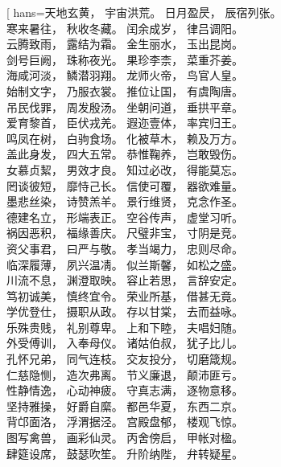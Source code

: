 \translate[
hans={天地玄黄， 宇宙洪荒。 日月盈昃， 辰宿列张。\\
     寒来暑往， 秋收冬藏。 闰余成岁， 律吕调阳。\\
     云腾致雨， 露结为霜。 金生丽水， 玉出昆岗。\\
     剑号巨阙， 珠称夜光。 果珍李柰， 菜重芥姜。\\
     海咸河淡， 鳞潜羽翔。 龙师火帝， 鸟官人皇。\\
     始制文字， 乃服衣裳。 推位让国， 有虞陶唐。\\
     吊民伐罪， 周发殷汤。 坐朝问道， 垂拱平章。\\
     爱育黎首， 臣伏戎羌。 遐迩壹体， 率宾归王。\\
     鸣凤在树， 白驹食场。 化被草木， 赖及万方。\\
     盖此身发， 四大五常。 恭惟鞠养， 岂敢毁伤。\\
     女慕贞絜， 男效才良。 知过必改， 得能莫忘。\\
     罔谈彼短， 靡恃己长。 信使可覆， 器欲难量。\\
     墨悲丝染， 诗赞羔羊。 景行维贤， 克念作圣。\\
     德建名立， 形端表正。 空谷传声， 虚堂习听。\\
     祸因恶积， 福缘善庆。 尺璧非宝， 寸阴是竞。\\
     资父事君， 曰严与敬。 孝当竭力， 忠则尽命。\\
     临深履薄， 夙兴温凊。 似兰斯馨， 如松之盛。\\
     川流不息， 渊澄取映。 容止若思， 言辞安定。\\
     笃初诚美， 慎终宜令。 荣业所基， 借甚无竟。\\
     学优登仕， 摄职从政。 存以甘棠， 去而益咏。\\
     乐殊贵贱， 礼别尊卑。 上和下睦， 夫唱妇随。\\
     外受傅训， 入奉母仪。 诸姑伯叔， 犹子比儿。\\
     孔怀兄弟， 同气连枝。 交友投分， 切磨箴规。\\
     仁慈隐恻， 造次弗离。 节义廉退， 颠沛匪亏。\\
     性静情逸， 心动神疲。 守真志满， 逐物意移。\\
     坚持雅操， 好爵自縻。 都邑华夏， 东西二京。\\
     背邙面洛， 浮渭据泾。 宫殿盘郁， 楼观飞惊。\\
     图写禽兽， 画彩仙灵。 丙舍傍启， 甲帐对楹。\\
     肆筵设席， 鼓瑟吹笙。 升阶纳陛， 弁转疑星。\\
}
